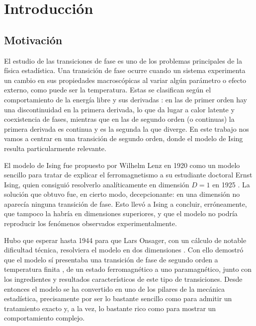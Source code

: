 \chapter{Introducción}

\section{Motivación}

El estudio de las transiciones de fase es uno de los problemas principales de la física estadística. Una transición de fase ocurre cuando un sistema experimenta un cambio en sus propiedades macroscópicas al variar algún parámetro o efecto externo, como puede ser la temperatura. Estas se clasifican según el comportamiento de la energía libre y sus derivadas \citep{Stanley1971}: en las de primer orden hay una discontinuidad en la primera derivada, lo que da lugar a calor latente y coexistencia de fases, mientras que en las de segundo orden (o continuas) la primera derivada es continua y es la segunda la que diverge. En este trabajo nos vamos a centrar en una transición de segundo orden, donde el modelo de Ising resulta particularmente relevante.

El modelo de Ising fue propuesto por Wilhelm Lenz en 1920 como un modelo sencillo para tratar de explicar el ferromagnetismo a su estudiante doctoral Ernst Ising, quien consiguió resolverlo analíticamente en dimensión $D=1$ en 1925 \citep{Ising1925}. La solución que obtuvo fue, en cierto modo, decepcionante: en una dimensión no aparecía ninguna transición de fase. Esto llevó a Ising a concluir, erróneamente, que tampoco la habría en dimensiones superiores, y que el modelo no podría reproducir los fenómenos observados experimentalmente.

Hubo que esperar hasta 1944 para que Lars Onsager, con un cálculo de notable dificultad técnica, resolviera el modelo en dos dimensiones \citep{Onsager1944}. Con ello demostró que el modelo sí presentaba una transición de fase de segundo orden a temperatura finita \citep{Peierls1936}, de un estado ferromagnético a uno paramagnético, junto con los ingredientes y resultados característicos de este tipo de transiciones. Desde entonces el modelo se ha convertido en uno de los pilares de la mecánica estadística, precisamente por ser lo bastante sencillo como para admitir un tratamiento exacto y, a la vez, lo bastante rico como para mostrar un comportamiento complejo.

